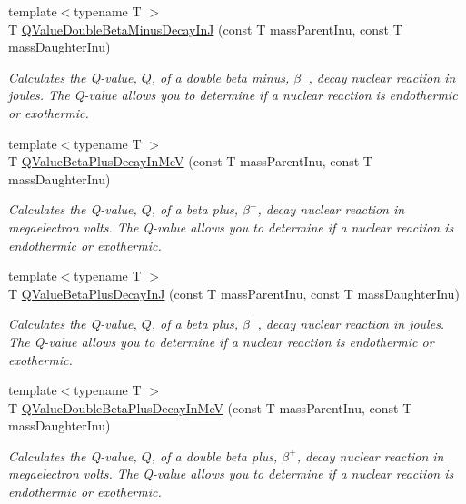 \begin{DoxyCompactItemize}
{\footnotesize template$<$typename T $>$ }\\T \mbox{\hyperlink{group___e_g_x_phys-_q_value-_beta_minus_ga5be6923812a1a701ed38965329dd6297}{Q\+Value\+Double\+Beta\+Minus\+Decay\+InJ}} (const T mass\+Parent\+Inu, const T mass\+Daughter\+Inu)
\begin{DoxyCompactList}\small\item\em Calculates the Q-\/value, $Q$, of a double beta minus, $\beta^-$, decay nuclear reaction in joules. The Q-\/value allows you to determine if a nuclear reaction is endothermic or exothermic. \end{DoxyCompactList}\item 
{\footnotesize template$<$typename T $>$ }\\T \mbox{\hyperlink{group___e_g_x_phys-_q_value-_beta_plus_ga3c4f7ec8e7c44d01d3aee6447a5ab443}{Q\+Value\+Beta\+Plus\+Decay\+In\+MeV}} (const T mass\+Parent\+Inu, const T mass\+Daughter\+Inu)
\begin{DoxyCompactList}\small\item\em Calculates the Q-\/value, $Q$, of a beta plus, $\beta^+$, decay nuclear reaction in megaelectron volts. The Q-\/value allows you to determine if a nuclear reaction is endothermic or exothermic. \end{DoxyCompactList}\item 
{\footnotesize template$<$typename T $>$ }\\T \mbox{\hyperlink{group___e_g_x_phys-_q_value-_beta_plus_gaaee51753f077c9fe05188aa5b24f642e}{Q\+Value\+Beta\+Plus\+Decay\+InJ}} (const T mass\+Parent\+Inu, const T mass\+Daughter\+Inu)
\begin{DoxyCompactList}\small\item\em Calculates the Q-\/value, $Q$, of a beta plus, $\beta^+$, decay nuclear reaction in joules. The Q-\/value allows you to determine if a nuclear reaction is endothermic or exothermic. \end{DoxyCompactList}\item 
{\footnotesize template$<$typename T $>$ }\\T \mbox{\hyperlink{group___e_g_x_phys-_q_value-_beta_plus_gab78be314eac63ddbce441b4c8b22b47d}{Q\+Value\+Double\+Beta\+Plus\+Decay\+In\+MeV}} (const T mass\+Parent\+Inu, const T mass\+Daughter\+Inu)
\begin{DoxyCompactList}\small\item\em Calculates the Q-\/value, $Q$, of a double beta plus, $\beta^+$, decay nuclear reaction in megaelectron volts. The Q-\/value allows you to determine if a nuclear reaction is endothermic or exothermic. \end{DoxyCompactList}\item 

\end{DoxyCompactItemize}
